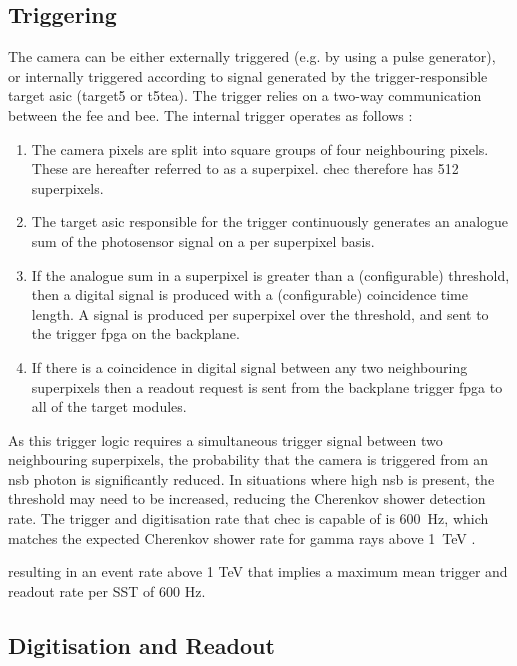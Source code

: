 \subsection{Triggering} \label{section:triggering}

The camera can be either externally triggered (e.g. by using a pulse generator), or internally triggered according to signal generated by the trigger-responsible \gls{target} \gls{asic} (\gls{target5} or \gls{t5tea}). The trigger relies on a two-way communication between the \gls{fee} and \gls{bee}. The internal trigger operates as follows \cite{Zorn2017}:
\begin{enumerate}
\item The camera pixels are split into square groups of four neighbouring pixels. These are hereafter referred to as a \gls{superpixel}. \gls{chec} therefore has 512 superpixels.
\item The \gls{target} \gls{asic} responsible for the trigger continuously generates an analogue sum of the photosensor signal on a per superpixel basis.
\item If the analogue sum in a superpixel is greater than a (configurable) threshold, then a digital signal is produced with a (configurable) coincidence time length. A signal is produced per superpixel over the threshold, and sent to the trigger \gls{fpga} on the backplane.
\item If there is a coincidence in digital signal between any two neighbouring superpixels then a readout request is sent from the backplane trigger \gls{fpga} to all of the \gls{target} modules.
\end{enumerate}
As this trigger logic requires a simultaneous trigger signal between two neighbouring superpixels, the probability that the camera is triggered from an \gls{nsb} photon is significantly reduced. In situations where high \gls{nsb} is present, the threshold may need to be increased, reducing the Cherenkov shower detection rate. The trigger and digitisation rate that \gls{chec} is capable of is \SI{600}{Hz}, which matches the expected Cherenkov shower rate for gamma rays above \SI{1}{TeV} \cite{Zorn2017}.

resulting in an event rate above 1 TeV that implies a maximum mean trigger and readout rate per SST of 600 Hz.

\subsection{Digitisation and Readout}

